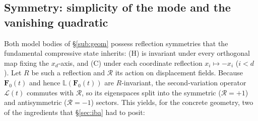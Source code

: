 \subsection{Symmetry: simplicity of the mode and the vanishing quadratic}
\label{sub:symmetry}

Both model bodies of \S\ref{sub:geom} possess reflection symmetries that the fundamental compressive state inherits:
(H) is invariant under every orthogonal map fixing the $x_d$-axis, and (C) under each coordinate reflection
$x_i\mapsto-x_i$ ($i<d$). Let $R$ be such a reflection and $\mathcal{R}$ its action on displacement fields. Because
$\bm{F}_0(t)$ and hence $\mathbb{L}(\bm{F}_0(t))$ are $R$-invariant, the second-variation operator $\mathcal{L}(t)$
commutes with $\mathcal{R}$, so its eigenspaces split into the symmetric ($\mathcal{R}=+1$) and antisymmetric
($\mathcal{R}=-1$) sectors. This yields, for the concrete geometry, two of the ingredients that \S\ref{sec:iba} had to
posit:


